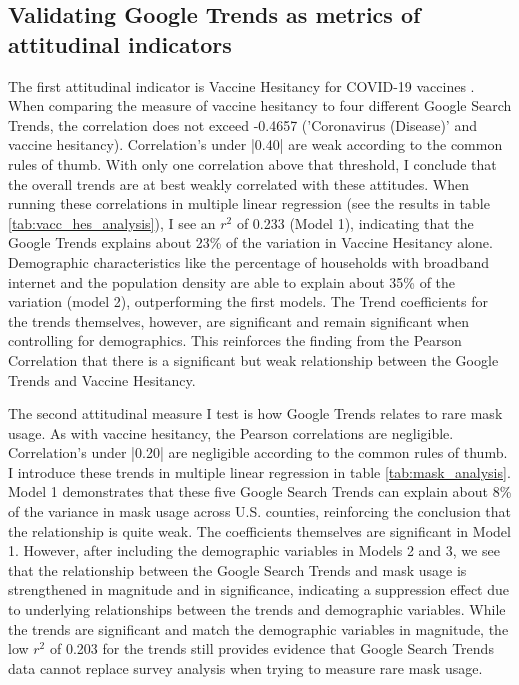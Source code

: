 \subsection{Validating Google Trends as metrics of attitudinal indicators}




The first attitudinal indicator is Vaccine Hesitancy for COVID-19 vaccines
\citep{vaches_data}. When comparing the measure of vaccine hesitancy to four
different Google Search Trends, the correlation does not exceed -0.4657
('Coronavirus (Disease)' and vaccine hesitancy). Correlation's under |0.40| are 
weak according to the common rules of thumb. With only one correlation 
above that threshold, I conclude that the overall trends are at best weakly
correlated with these attitudes. When running these
correlations in multiple linear regression (see the results in table
\ref{tab:vacc_hes_analysis}), I see an $r^2$ of 0.233 (Model 1),
indicating that the Google Trends explains about 23\% of
the variation in Vaccine Hesitancy alone. Demographic characteristics like the
percentage of households with broadband internet and the population density are
able to explain about 35\% of the variation (model 2), outperforming the first
models. The Trend coefficients for the trends themselves, however, are
significant and remain significant when controlling for demographics. This reinforces the finding from the Pearson Correlation that there is a significant but weak relationship between the Google Trends and Vaccine Hesitancy.



The second attitudinal measure I test is how Google Trends relates to rare mask
usage. As with vaccine hesitancy, the Pearson correlations are negligible.
Correlation's under |0.20| are negligible according to the
common rules of thumb. I introduce these trends in multiple linear regression in
table \ref{tab:mask_analysis}. Model 1 demonstrates that these five Google
Search Trends can explain about 8\% of the variance in mask usage across U.S.
counties, reinforcing the conclusion that the relationship is quite weak. The
coefficients themselves are significant in Model 1. However, after
including the demographic variables in Models 2 and 3, we see that the
relationship between the Google Search Trends and mask usage is strengthened in
magnitude and in significance, indicating a suppression effect due to
underlying relationships between the trends and demographic variables. While the
trends are significant and match the demographic variables in magnitude, the
low $r^2$ of 0.203 for the trends still provides evidence that Google Search
Trends data cannot replace survey analysis when trying to measure rare mask
usage.

